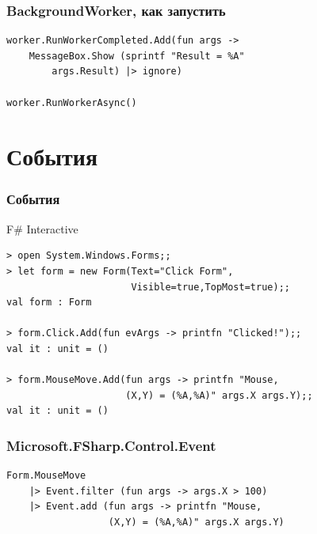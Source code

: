 \documentclass[xetex,mathserif,serif]{beamer}
\begin{document}
	\begin{frame}[fragile]
		\frametitle{BackgroundWorker, как запустить}
		\begin{verbatim}
worker.RunWorkerCompleted.Add(fun args ->
    MessageBox.Show (sprintf "Result = %A" 
        args.Result) |> ignore)

worker.RunWorkerAsync()
		\end{verbatim}
	\end{frame}

	\section{События}

	\begin{frame}[fragile]
		\frametitle{События}
		\begin{alertblock}{F\# Interactive}
			\begin{verbatim}
> open System.Windows.Forms;;
> let form = new Form(Text="Click Form",  
                      Visible=true,TopMost=true);;
val form : Form

> form.Click.Add(fun evArgs -> printfn "Clicked!");;
val it : unit = ()

> form.MouseMove.Add(fun args -> printfn "Mouse, 
                     (X,Y) = (%A,%A)" args.X args.Y);;
val it : unit = ()
			\end{verbatim}
		\end{alertblock}
\end{frame}

	\begin{frame}[fragile]
		\frametitle{Microsoft.FSharp.Control.Event}
		\begin{verbatim}
Form.MouseMove
    |> Event.filter (fun args -> args.X > 100)
    |> Event.add (fun args -> printfn "Mouse, 
                  (X,Y) = (%A,%A)" args.X args.Y)
		\end{verbatim}
	\end{frame}
\end{document}
